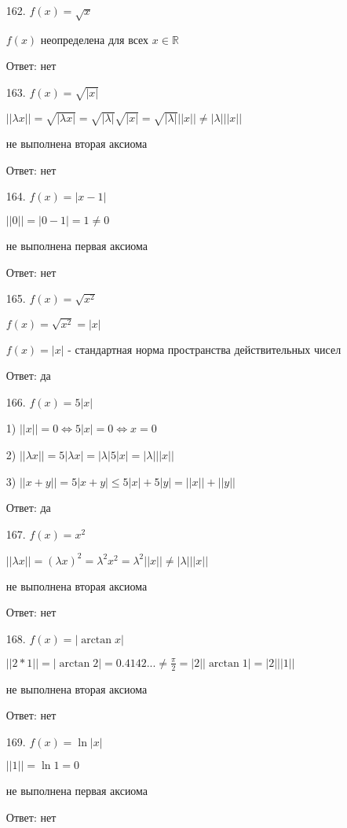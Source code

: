 \documentclass[oneside, final, 11pt]{article}
\begin{document}
	\begin{enumerate}
		\item[162.] $f(x) = \sqrt{x}$
		
		$f(x)$ неопределена для всех $x \in \mathbb{R}$
		
		Ответ: нет
		
		\item[163.] $f(x) = \sqrt{|x|}$
				
		$||\lambda x|| = \sqrt{|\lambda x|} = \sqrt{|\lambda|} \sqrt{|x|} = \sqrt{|\lambda|} ||x|| \neq |\lambda|||x||$
		
		не выполнена вторая аксиома
		
		Ответ: нет
		
		\item[164.] $f(x) = |x-1|$
				
		$||0|| = |0 - 1| = 1 \neq 0 $ 
		
		не выполнена первая аксиома
		
		Ответ: нет
		
		\item[165.] $f(x) = \sqrt{x^2}$
		
		$f(x) = \sqrt{x^2} = |x|$
				
		$f(x) = |x|$ - стандартная норма пространства действительных чисел
		
		Ответ: да
		
		\item[166.] $f(x) = 5|x|$
				
		1) $||x|| = 0 \Leftrightarrow 5|x| = 0 \Leftrightarrow x = 0$
		
		2) $||\lambda x|| = 5|\lambda x| = |\lambda|5|x| = |\lambda| ||x||$
		
		3) $||x + y|| = 5|x + y| \leq 5|x| + 5|y| = ||x|| + ||y||$
		
		Ответ: да
		
		\item[167.] $f(x) = x^2$
				
		$||\lambda x|| = (\lambda x)^2 = \lambda^2 x^2 = \lambda^2 ||x|| \neq |\lambda|||x||$
		
		не выполнена вторая аксиома
		
		Ответ: нет
		
		\item[168.] $f(x) = |\arctan{x}|$
				
		$||2 * 1|| = |\arctan{2}| = 0.4142... \neq \frac{\pi}{2} = |2| |\arctan{1}| = |2|||1|| $
		
		не выполнена вторая аксиома
		
		Ответ: нет
		
		\item[169.] $f(x) = \ln{|x|}$
		
		$||1|| = \ln{1} = 0 $
		
		не выполнена первая аксиома
		
		Ответ: нет
		
	\end{enumerate}
\end{document}
